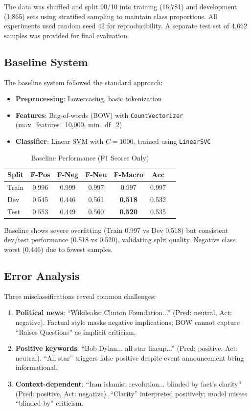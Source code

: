 \documentclass[10pt,a4paper]{article}
\begin{document}
The data was shuffled and split 90/10 into training (16,781) and development (1,865) sets using stratified sampling to maintain class proportions. All experiments used random seed 42 for reproducibility. A separate test set of 4,662 samples was provided for final evaluation.

\subsection{Baseline System}
The baseline system followed the standard approach:
\begin{itemize}
    \item \textbf{Preprocessing}: Lowercasing, basic tokenization
    \item \textbf{Features}: Bag-of-words (BOW) with \texttt{CountVectorizer} (max\_features=10,000, min\_df=2)
    \item \textbf{Classifier}: Linear SVM with $C=1000$, trained using \texttt{LinearSVC}
\end{itemize}

\begin{table}[h]
\centering
\caption{Baseline Performance (F1 Scores Only)}
\label{tab:baseline}
\scriptsize
\begin{tabular}{lcccccc}
\toprule
\textbf{Split} & \textbf{F-Pos} & \textbf{F-Neg} & \textbf{F-Neu} & \textbf{F-Macro} & \textbf{Acc} \\
\midrule
Train & 0.996 & 0.999 & 0.997 & 0.997 & 0.997 \\
Dev   & 0.545 & 0.446 & 0.561 & \textbf{0.518} & 0.532 \\
Test  & 0.553 & 0.449 & 0.560 & \textbf{0.520} & 0.535 \\
\bottomrule
\end{tabular}
\end{table}

Baseline shows severe overfitting (Train 0.997 vs Dev 0.518) but consistent dev/test performance (0.518 vs 0.520), validating split quality. Negative class worst (0.446) due to fewest samples.

\subsection{Error Analysis}
Three misclassifications reveal common challenges:

\begin{enumerate}
    \item \textbf{Political news}: ``Wikileaks: Clinton Foundation...'' (Pred: neutral, Act: negative). Factual style masks negative implications; BOW cannot capture ``Raises Questions'' as implicit criticism.
    
    \item \textbf{Positive keywords}: ``Bob Dylan... all star lineup...'' (Pred: positive, Act: neutral). ``All star'' triggers false positive despite event announcement being informational.
    
    \item \textbf{Context-dependent}: ``Iran islamist revolution... blinded by fact's clarity'' (Pred: positive, Act: negative). ``Clarity'' interpreted positively; model misses ``blinded by'' criticism.
\end{enumerate}
\end{document}
